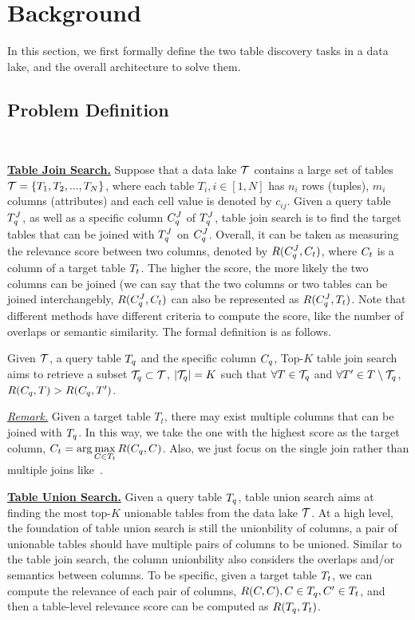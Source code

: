 \section{Background} 
In this section, we first formally define the two table discovery tasks in a data lake, and the overall architecture to solve them.

\subsection{Problem Definition}~\label{subsec:def}


\noindent\textbf{\underline{Table Join Search.}}
Suppose that a data lake $\mathcal{T}$ contains a large set of tables $\mathcal{T}=\{T_1, T_2, ..., T_N\}$, where each table $T_i, i \in [1,N]$ has $n_i$ rows (tuples), $m_i$ columns (attributes) and each cell value is denoted by $c_{ij}$.  Given a query table $T^J_q$, as well as a specific column $C^J_q$ of $T^J_q$, table join search is to find the target tables that can be joined with  $T^J_q$ on $C^J_q$.
%
Overall, it can be taken as measuring the relevance score between two columns, denoted by $R(C^J_q, C_t)$, where   $C_t$ is a column  of a target table $T_t$. The higher the score, the more likely the two columns can be joined (we can say that the two columns or two tables can be joined interchangebly, \ie $R(C^J_q, C_t)$  can also be represented as $R(C^J_q, T_t)$.
Note that different methods have different criteria to compute the score, like the number of overlaps or semantic similarity.
 The formal definition is as follows. 

\begin{definition}
	Given $\mathcal{T}$, a query table $T_q$ and the specific column $C_q$, Top-$K$ table join search aims to retrieve a subset $\mathcal{T}_q \subset \mathcal{T}$, $|\mathcal{T}_q|=K$ such that $\forall T \in \mathcal{T}_q$ and $\forall T' \in T \setminus \mathcal{T}_q$, $R(C_q, T)>R(C_q, T')$.
\end{definition}

\noindent \underline{\textit{Remark.}} Given a target table $T_t$, there may exist multiple columns that can be joined with $T_q$. In this way,  we  take the one with the highest score as the target column, \ie $C_t=\arg\max\limits_{C\in T_t} R(C_q, C)$. Also, we just focus on the single join rather than multiple joins like~\cite{}.

\noindent\textbf{\underline{Table Union Search.}} Given a query table $T_q$,  table union search aims at finding the most top-$K$ unionable tables from the data lake $\mathcal{T}$. At a high level, the foundation of table union search is still the unionbility of  columns, \ie a pair of unionable tables should have multiple pairs of columns to be unioned. Similar to the table join search, the column unionbility also considers the overlaps and/or semantics between columns. To be specific, given a target table $T_t$, we can compute the relevance of each pair of columns, \ie   $R(C, C), C \in T_q, C' \in T_t$, and then a table-level relevance score can be computed as $R(T_q, T_t)$.


